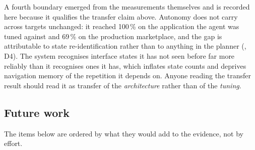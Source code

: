 A fourth boundary emerged from the measurements themselves and is recorded
here because it qualifies the transfer claim above. Autonomy does not carry
across targets unchanged: it reached 100\,\% on the application the agent was
tuned against and 69\,\% on the production marketplace, and the gap is
attributable to state re-identification rather than to anything in the planner
(, D4). The system recognises interface states it has not
seen before far more reliably than it recognises ones it has, which inflates
state counts and deprives navigation memory of the repetition it depends on.
Anyone reading the transfer result should read it as transfer of the
\emph{architecture} rather than of the \emph{tuning}.

\subsection*{Future work}

The items below are ordered by what they would add to the evidence, not by
effort.

